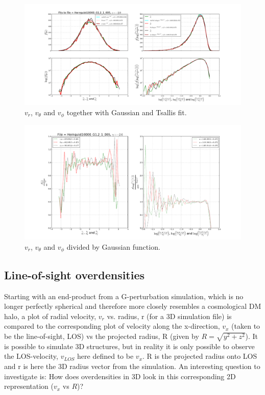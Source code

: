 \begin{figure}
\centering
\includegraphics[width=1.0\linewidth]{img/vr_vtheta_vphi_fit.png}
\caption{$v_{r}$, $v_{\theta}$ and $v_{\phi}$ together with Gaussian and Tsallis fit.}
\label{fig:test}
\end{figure}

\begin{figure}
\centering
\includegraphics[width=1.0\linewidth]{img/func_guess_vr_vtheta_vphi.png}
\caption{$v_{r}$, $v_{\theta}$ and $v_{\phi}$ divided by Gaussian function.}
\label{fig:test}
\end{figure}

\newpage
\subsection{Line-of-sight overdensities}
Starting with an end-product from a G-perturbation simulation, which is no longer perfectly spherical and therefore more closely resembles a cosmological DM halo, a plot of radial velocity, $v_r$ vs. radius, r (for a 3D simulation file) is compared to the corresponding plot of velocity along the x-direction, $v_x$ (taken to be the line-of-sight, LOS) vs the projected radius, R (given by $R = \sqrt{y^2+z^2}$).
It is possible to simulate 3D structures, but in reality it is only possible to observe the LOS-velocity, $v_{LOS}$ here defined to be $v_x$. R is the projected radius onto LOS and r is here the 3D radius vector from the simulation.
An interesting question to investigate is: How does overdensities in 3D look in this corresponding 2D representation ($v_x$ vs $R$)?

